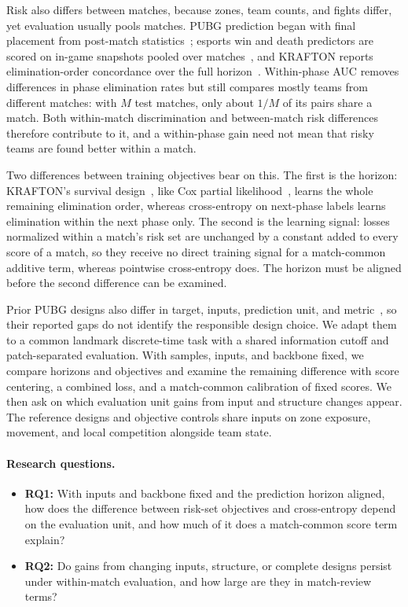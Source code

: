 \documentclass[sigconf,anonymous,nonacm]{acmart}
\begin{document}
Risk also differs between matches, because zones, team counts, and fights differ, yet evaluation usually pools matches. PUBG prediction began with final placement from post-match statistics~\cite{KagglePUBG}; esports win and death predictors are scored on in-game snapshots pooled over matches~\cite{Hodge21,Katona19,Marshall22}, and KRAFTON reports elimination-order concordance over the full horizon~\cite{KRAFTON}. Within-phase AUC removes differences in phase elimination rates but still compares mostly teams from different matches: with $M$ test matches, only about $1/M$ of its pairs share a match. Both within-match discrimination and between-match risk differences therefore contribute to it, and a within-phase gain need not mean that risky teams are found better within a match.

Two differences between training objectives bear on this. The first is the horizon: KRAFTON's survival design~\cite{KRAFTON}, like Cox partial likelihood~\cite{Cox72}, learns the whole remaining elimination order, whereas cross-entropy on next-phase labels learns elimination within the next phase only. The second is the learning signal: losses normalized within a match's risk set are unchanged by a constant added to every score of a match, so they receive no direct training signal for a match-common additive term, whereas pointwise cross-entropy does. The horizon must be aligned before the second difference can be examined.

Prior PUBG designs also differ in target, inputs, prediction unit, and metric~\cite{Sagong25a,KRAFTON}, so their reported gaps do not identify the responsible design choice. We adapt them to a common landmark discrete-time task with a shared information cutoff and patch-separated evaluation. With samples, inputs, and backbone fixed, we compare horizons and objectives and examine the remaining difference with score centering, a combined loss, and a match-common calibration of fixed scores. We then ask on which evaluation unit gains from input and structure changes appear. The reference designs and objective controls share inputs on zone exposure, movement, and local competition alongside team state.

\paragraph{Research questions.}
\begin{itemize}
\item \textbf{RQ1:} With inputs and backbone fixed and the prediction horizon aligned, how does the difference between risk-set objectives and cross-entropy depend on the evaluation unit, and how much of it does a match-common score term explain?
\item \textbf{RQ2:} Do gains from changing inputs, structure, or complete designs persist under within-match evaluation, and how large are they in match-review terms?
\end{itemize}
\end{document}
